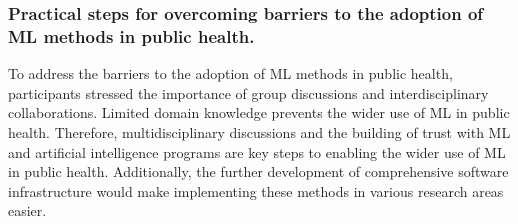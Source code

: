 \subsubsection{Practical steps for overcoming barriers to the adoption of ML methods in public health.} 
To address the barriers to the adoption of ML methods in public health, participants stressed the importance of group discussions and interdisciplinary collaborations. Limited domain knowledge prevents the wider use of ML in public health. Therefore, multidisciplinary discussions and the building of trust with ML and artificial intelligence programs are key steps to enabling the wider use of ML in public health. Additionally, the further development of comprehensive software infrastructure would make implementing these methods in various research areas easier.
